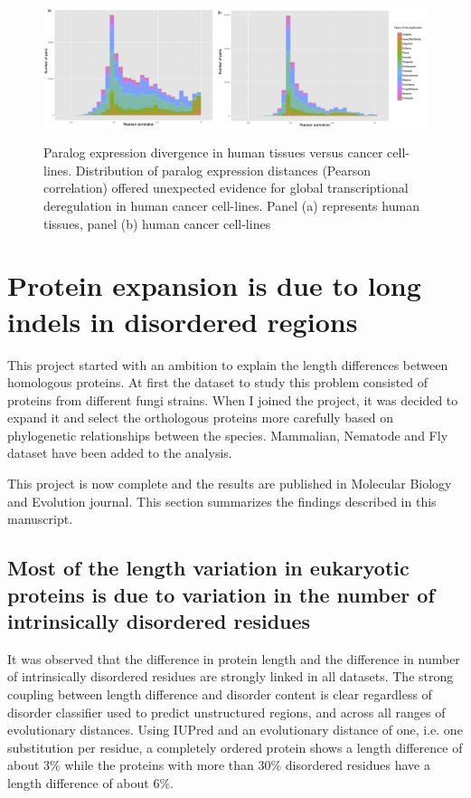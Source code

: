 \documentclass[11pt, a4paper,oneside]{report}
\begin{document}
\begin{figure}[ht]
\begin{center}
\label{img:populations}
\includegraphics[width=1\textwidth]{figures/fantom.png}
\end{center}
\caption{Paralog expression divergence in human tissues versus cancer cell-lines.
Distribution of paralog expression distances (Pearson correlation) offered unexpected evidence for global transcriptional deregulation in human cancer cell-lines. Panel (a) represents human tissues, panel (b) human cancer cell-lines} 
\end{figure}

\section{Protein expansion is due to long indels in disordered regions}
This project started with an ambition to explain the length differences between homologous proteins.  At first the dataset to study this problem consisted of proteins from different fungi strains. When I joined the project, it was decided to expand it and select the orthologous proteins more carefully based on phylogenetic relationships between the species. Mammalian, Nematode and Fly dataset have been added to the analysis. 

This project is now complete and the results are published in Molecular Biology and Evolution journal\cite{Light2013}. This section summarizes the findings described in this manuscript. 
\subsection{Most of the length variation in eukaryotic proteins is due to variation in the number of intrinsically disordered residues}
It was observed that the difference in protein length and the difference in number of intrinsically disordered residues are strongly linked in all datasets. The strong coupling between length difference and disorder content is clear regardless of disorder classifier used to predict unstructured regions, and across all ranges of evolutionary distances. Using IUPred and an evolutionary distance of one, i.e. one substitution per residue, a completely ordered protein
shows a length difference of about 3\% while the proteins with more than 30\% disordered residues have a length difference of about 6\%.
\end{document}
